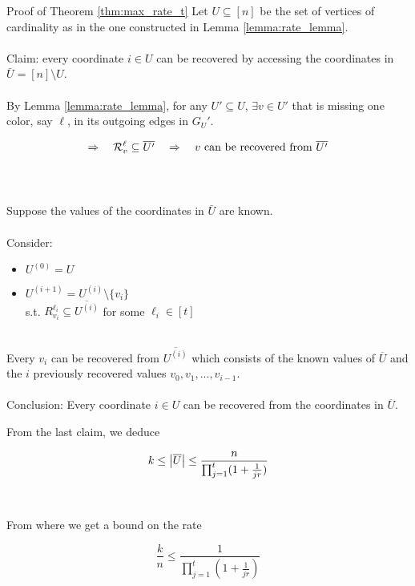 \begin{frame}{Proof of Theorem \ref{thm:max_rate_t}}
    Let $U \subseteq [n]$ be the set of vertices of cardinality as in the one constructed in Lemma \ref{lemma:rate_lemma}. \\~\\
    
    Claim: every coordinate $i\in U$ can be recovered by accessing the coordinates in $\bar{U} = [n] \setminus U$. \\~\\
    
    By Lemma \ref{lemma:rate_lemma}, for any $U' \subseteq U$, $\exists v\in U'$ that is missing one color, say $\ell$, in its outgoing edges in $G_U'$. 
    
    $$ \Rightarrow \quad \mathcal{R}_v^\ell \subseteq \overline{U'} \quad \Rightarrow \quad v \mbox{ can be recovered from } \overline{U'}$$ \\~\\
    
\end{frame}

\begin{frame}

    Suppose the values of the coordinates in $\bar{U}$ are known. \\~\\
    
    Consider:
    \begin{itemize}
        \item $U^{(0)} = U$
        \item $U^{(i+1)} = U^{(i)} \setminus \{v_{i}\}$ \\
         s.t. $R_{v_i}^{\ell_i} \subseteq \overline{U^{(i)}}$ for some $\ell_i \in [t]$ \\~\\
    \end{itemize}
    
    Every $v_i$ can be recovered from $\overline{U^{(i)}}$ which consists of the known values of $\overline{U}$ and the $i$ previously recovered values $v_0, v_1, ..., v_{i-1}$. \\~\\
    
    Conclusion: Every coordinate $i \in U$ can be recovered from the coordinates in $\overline{U}$.
\end{frame}

\begin{frame}
    From the last claim, we deduce
    
    $$ k \leq \left\vert {\overline{U}} \right\vert \leq \frac{n}{\prod_{j=1}^t (1 + \frac{1}{jr})}$$ \\~\\
    
    From where we get a bound on the rate
    
    $$\frac{k}{n} \leq \frac{1}{\prod_{j=1}^t (1 + \frac{1}{jr})}$$
    
    \qedsymbol
\end{frame}

